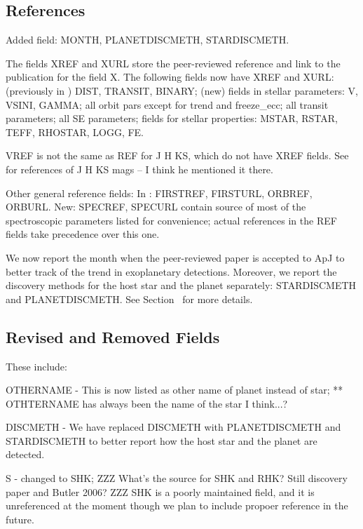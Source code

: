 \documentclass[11pt,preprint]{aastex}
\begin{document}
\begin{CJK*}{UTF8}{gbsn}
\subsection{References}

Added field: MONTH, PLANETDISCMETH, STARDISCMETH.

The fields XREF and XURL store the peer-reviewed reference and link to
the publication for the field X. The following fields now have XREF
and XURL: (previously in \citealt{Wright2011}) DIST, TRANSIT, BINARY;
(new) fields in stellar parameters: V, VSINI, GAMMA; all orbit pars except for
trend and freeze\_ecc; all transit parameters; all SE parameters;
fields for stellar properties: MSTAR, RSTAR, TEFF, RHOSTAR, LOGG, FE.

VREF is not the same as REF for J H KS, which do not have XREF
fields. See \cite{Wright2011} for references of J H KS mags -- I think
he mentioned it there.

Other general reference fields: In \cite{Wright2011}: FIRSTREF,
FIRSTURL, ORBREF, ORBURL. New: SPECREF, SPECURL contain source of most
of the spectroscopic parameters listed for convenience; actual
references in the REF fields take precedence over this one.

We now report the month when the peer-reviewed paper is accepted to
ApJ to better track of the trend in exoplanetary detections. Moreover,
we report the discovery methods for the host star and the planet
separately: STARDISCMETH and PLANETDISCMETH. See Section~ for more
details.  


\subsection{Revised and Removed Fields}

These include:

OTHERNAME - This is now listed as other name of planet instead of star;
** OTHTERNAME has always been the name of the star I think...?

DISCMETH - We have replaced DISCMETH with PLANETDISCMETH and STARDISCMETH to better report how the host star and the planet are detected. 

S - changed to SHK; ZZZ What's the source for SHK and RHK? Still discovery
paper and Butler 2006? ZZZ SHK is a poorly maintained field, and it is
unreferenced at the moment though we plan to include propoer reference
in the future.


\end{CJK*}
\end{document}
